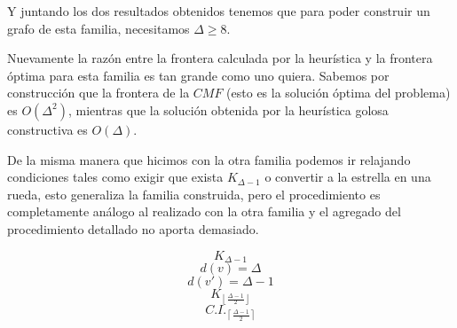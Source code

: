 Y juntando los dos resultados obtenidos tenemos que para poder construir un 
grafo de esta familia, necesitamos $\Delta \geq 8 $.

Nuevamente la raz\'on entre la frontera calculada por la heur\'istica y la frontera 
\'optima para esta familia es tan grande como uno quiera. Sabemos por construcci\'on 
que la frontera de la $CMF$ (esto es la soluci\'on \'optima del problema) es 
$O(\Delta^2)$, mientras que la soluci\'on obtenida por la heur\'istica golosa 
constructiva es $O(\Delta)$.

De la misma manera que hicimos con la otra familia podemos ir relajando condiciones
tales como exigir que exista $K_{\Delta -1}$ o convertir a la estrella en una rueda, 
esto generaliza la familia construida, pero el procedimiento es completamente an\'alogo
al realizado con la otra familia y el agregado del procedimiento detallado no aporta 
demasiado.

\[ K_{\Delta -1} \]
\[ d(v) = \Delta \]
\[ d(v') = \Delta -1 \]
\[ K_{\left\lfloor \frac{\Delta -1}{2} \right\rfloor} \]
\[ C.I._{\left\lceil \frac{\Delta -1}{2} \right\rceil} \]
